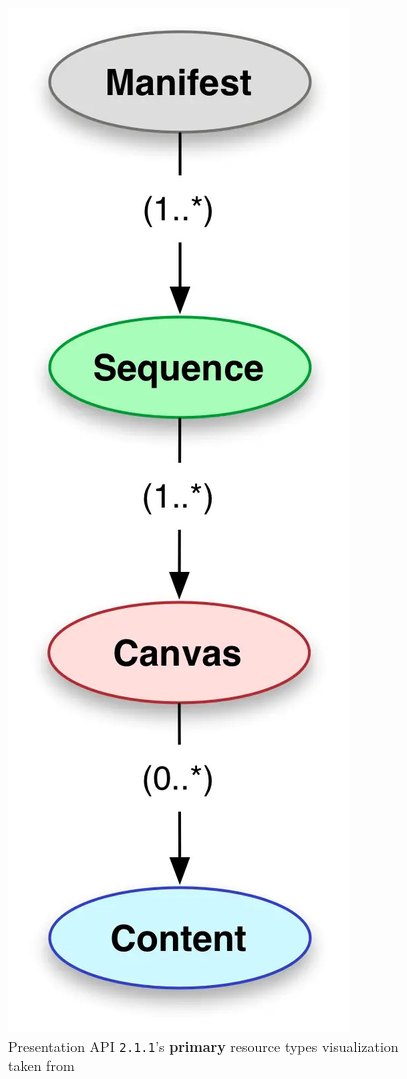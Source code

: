 \begin{figure}[htbp]
    \centering
	\includegraphics[height=0.4\textheight]{images/pres_api_2_simple.jpg}
	\caption{Presentation API \texttt{2.1.1}'s \textbf{primary} resource types visualization taken from \citet{appleby2017presentation}}
	\label{fig:pres_api_2_simple}
\end{figure}

